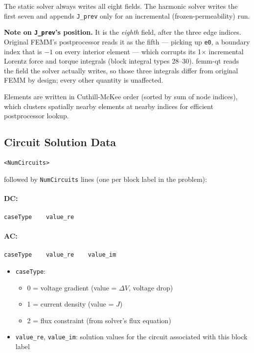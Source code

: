 \documentclass[11pt]{article}
\begin{document}
The static solver always writes all eight fields.  The harmonic solver
writes the first seven and appends \texttt{J\_prev} only for an incremental
(frozen-permeability) run.

\medskip\noindent
\textbf{Note on \texttt{J\_prev}'s position.}  It is the \emph{eighth} field,
after the three edge indices.  Original FEMM's postprocessor reads it as the
fifth --- picking up \texttt{e0}, a boundary index that is $-1$ on every
interior element --- which corrupts its 1$\times$ incremental Lorentz force
and torque integrals (block integral types 28--30).  femm-qt reads the field
the solver actually writes, so those three integrals differ from original
FEMM by design; every other quantity is unaffected.

Elements are written in Cuthill-McKee order (sorted by sum of node
indices), which clusters spatially nearby elements at nearby indices for
efficient postprocessor lookup.

\subsection{Circuit Solution Data}

\begin{lstlisting}
<NumCircuits>
\end{lstlisting}

followed by \texttt{NumCircuits} lines (one per block label in the
problem):

\paragraph{DC:}
\begin{lstlisting}
caseType    value_re
\end{lstlisting}

\paragraph{AC:}
\begin{lstlisting}
caseType    value_re    value_im
\end{lstlisting}

\begin{itemize}[nosep]
  \item \texttt{caseType}:
    \begin{itemize}[nosep]
      \item 0 = voltage gradient (value = $\Delta V$, voltage drop)
      \item 1 = current density (value = $J$)
      \item 2 = flux constraint (from solver's flux equation)
    \end{itemize}
  \item \texttt{value\_re}, \texttt{value\_im}: solution values for the
        circuit associated with this block label
\end{itemize}
\end{document}
